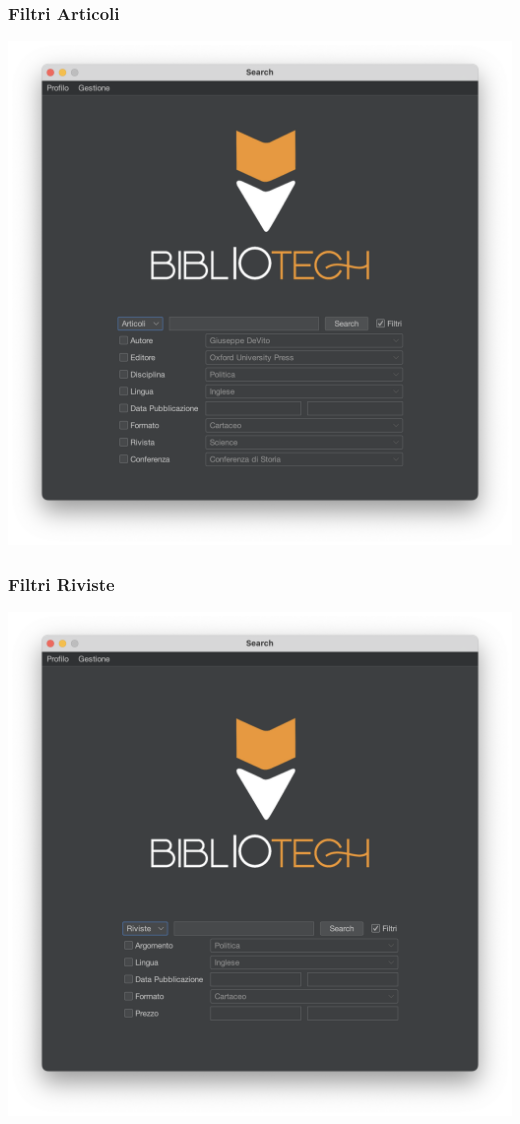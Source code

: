 \subsubsection{Filtri Articoli}
\includegraphics[scale=0.25]{Immagini/Schermate/Search/SearchPage-FiltriArticoli.png}
\subsubsection{Filtri Riviste}
\includegraphics[scale=0.25]{Immagini/Schermate/Search/SearchPage-FiltriRiviste.png}

